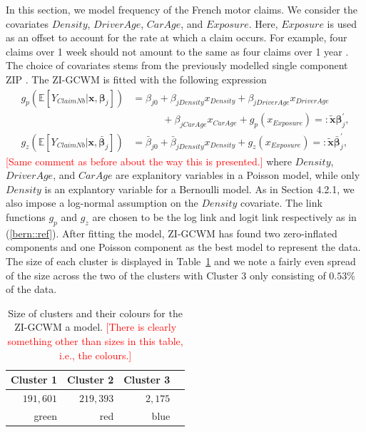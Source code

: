 \documentclass[11pt,letterpaper]{article}
\numberwithin{equation}{section}
\numberwithin{equation}{section}
\numberwithin{equation}{section}
\newcommand{\xTilda}{\tilde{\bm{x}}}
\begin{document}
In this section, we model frequency of the French motor claims. We consider the covariates $Density$, $DriverAge$, $CarAge$, and $Exposure$. Here, $Exposure$ is used as an offset to account for the rate at which a claim occurs. For example, four claims over 1 week should not amount to the same as four claims over 1 year \citep{frees2015}. The choice of covariates stems from the previously modelled single component ZIP \citep{Charpentier:2014}.
The ZI-GCWM is fitted with the following expression
\begin{align}
g_p(\mathbb{E}\left[Y_{ClaimNb}|\bm{x}, \bm{\beta}_j \right]) & = 
  \beta_{j0} +  \beta_{jDensity}x_{Density}+ \beta_{jDriverAge}x_{DriverAge} \nonumber \\    &  \quad\quad\quad +  \beta_{jCarAge}x_{CarAge}   + g_p(x_{Exposure})  =: \bm{\xTilda} \bm{\beta}_j^{'},   \label{poissonReg}\\
g_z(\mathbb{E}\left[Y_{ClaimNb}|\bm{x}, \bar{\bm{\beta}}_j \right])& = \bar{\beta}_{j0} +  \bar{\beta}_{jDensity} x_{Density} + g_z(x_{Exposure})  =: \bm{\xTilda} \bar{\bm{\beta}}_j^{'},  \label{zeroReg} 
\end{align}
\textcolor{red}{[Same comment as before about the way this is presented.]}
where $Density$, $DriverAge$, and $CarAge$ are explanitory variables in a Poisson model, while only $Density$ is an explantory variable for a Bernoulli model. As in Section 4.2.1, we also impose a log-normal assumption on the $Density$ covariate. The link functions $g_p$ and $g_z$ are chosen to be the log link and logit link respectively as in (\ref{bern::ref}).
After fitting the model, ZI-GCWM has found two zero-inflated components and one Poisson component as the best model to represent the data. The size of each cluster is displayed in Table~\ref{table:sizeFreq} and we note a fairly even spread of the size across the two of the clusters with Cluster 3 only consisting of $0.53 \%$ of the data.
\begin{table}[!htb]
\centering
\caption{Size of clusters and their colours for the ZI-GCWM a model. \textcolor{red}{[There is clearly something other than sizes in this table, i.e., the colours.]}}
\label{table:sizeFreq}
\begin{tabular}{rrrr}
\hline
Cluster 1   & Cluster 2  & Cluster 3   \\
\hline
$191,601$& $219,393$ & $2,175$ \\
green & red & blue  \\
\hline
\end{tabular}
\end{table}
\end{document}
